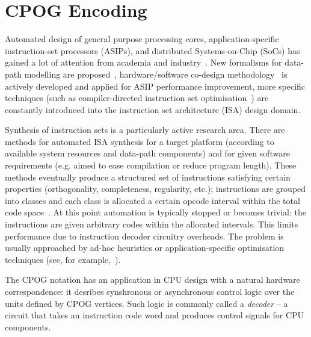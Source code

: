 \section{CPOG Encoding}

Automated design of general purpose processing cores, application-specific
instruction-set processors (ASIPs), and distributed Systems-on-Chip
(SoCs) has gained a lot of attention from academia and industry~\cite{2006_dutt_chapter}.
New formalisms for data-path modelling are proposed~\cite{2010_mokhov_ieee}\cite{2008_sokolov_sdfs},
hardware/software co-design methodology~\cite{1993_alomary_edac}
is actively developed and applied for ASIP performance improvement,
more specific techniques (such as compiler-directed instruction set
optimisation~\cite{2002_qin_date}) are constantly introduced into
the instruction set architecture (ISA) design domain.

%
%


Synthesis of instruction sets is a particularly active research area.
There are methods for automated ISA synthesis for a target platform
(according to available system resources and data-path components)
and for given software requirements (e.g. aimed to ease compilation
or reduce program length). These methods eventually produce a structured
set of instructions satisfying certain properties (orthogonality,
completeness, regularity, etc.); instructions are grouped into classes
and each class is allocated a certain opcode interval within the total
code space~\cite{2003_nohl_dac}. At this point automation is typically
stopped or becomes trivial: the instructions are given arbitrary codes
within the allocated intervals. This limits performance due to instruction
decoder circuitry overheads. The problem is usually approached by
ad-hoc heuristics or application-specific optimisation techniques
(see, for example,~\cite{2002_lee_iccad}).

The CPOG notation has an application in CPU design with a natural hardware correspondence: it desribes synshronous or asynchronous control logic over the units defined by CPOG vertices. Such logic is commonly called a \emph{decoder} -- a circuit that takes an instruction code word and produces control signals for CPU components.  

